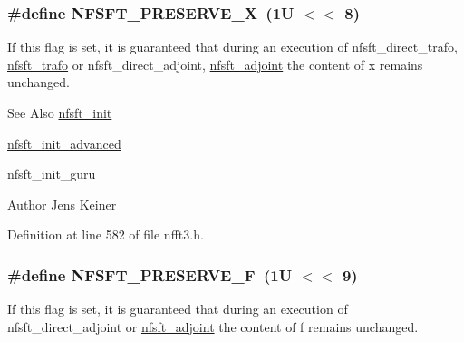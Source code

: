 \hypertarget{group__nfsft_gacf7d73753b74dbf148167c3d46226f09}{
\subsubsection[{N\-F\-S\-F\-T\-\_\-\-P\-R\-E\-S\-E\-R\-V\-E\-\_\-\-X}]{\setlength{\rightskip}{0pt plus 5cm}\#define N\-F\-S\-F\-T\-\_\-\-P\-R\-E\-S\-E\-R\-V\-E\-\_\-\-X~(1\-U $<$$<$ 8)}}\label{group__nfsft_gacf7d73753b74dbf148167c3d46226f09}
If this flag is set, it is guaranteed that during an execution of nfsft\-\_\-direct\-\_\-trafo, \hyperlink{group__nfsft_ga5796fc68c432d46dfcab7abd8c56ee22}{nfsft\-\_\-trafo} or nfsft\-\_\-direct\-\_\-adjoint, \hyperlink{group__nfsft_ga813bb48d404c7286310733c99a81a169}{nfsft\-\_\-adjoint} the content of {\ttfamily x} remains unchanged.

\begin{DoxySeeAlso}{See Also}
\hyperlink{group__nfsft_ga65cda3f4a3edc5eb39c697cf34b1f0b9}{nfsft\-\_\-init} 

\hyperlink{group__nfsft_ga2812aa5beba0eb7efd3072bf323a0155}{nfsft\-\_\-init\-\_\-advanced} 

nfsft\-\_\-init\-\_\-guru 
\end{DoxySeeAlso}
\begin{DoxyAuthor}{Author}
Jens Keiner 
\end{DoxyAuthor}


Definition at line 582 of file nfft3.\-h.

\hypertarget{group__nfsft_ga45962e763c2c551c1ea764a68b686b5c}{
\subsubsection[{N\-F\-S\-F\-T\-\_\-\-P\-R\-E\-S\-E\-R\-V\-E\-\_\-\-F}]{\setlength{\rightskip}{0pt plus 5cm}\#define N\-F\-S\-F\-T\-\_\-\-P\-R\-E\-S\-E\-R\-V\-E\-\_\-\-F~(1\-U $<$$<$ 9)}}\label{group__nfsft_ga45962e763c2c551c1ea764a68b686b5c}
If this flag is set, it is guaranteed that during an execution of nfsft\-\_\-direct\-\_\-adjoint or \hyperlink{group__nfsft_ga813bb48d404c7286310733c99a81a169}{nfsft\-\_\-adjoint} the content of {\ttfamily f} remains unchanged.

